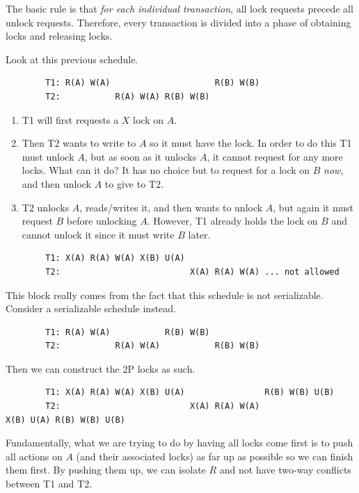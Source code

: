     \begin{definition}
      \label{def:two-phase-locking-2pl}
      The basic rule is that \textit{for each individual transaction}, all lock requests precede all unlock requests. Therefore, every transaction is divided into a phase of obtaining locks and releasing locks.   
    \end{definition}

    \begin{example}[2PL]
      \label{ex:2pl}
      Look at this previous schedule. 
      \begin{lstlisting}
        T1: R(A) W(A)                     R(B) W(B)
        T2:           R(A) W(A) R(B) W(B) 
      \end{lstlisting}
      \begin{enumerate}
        \item T1 will first requests a $X$ lock on $A$. 
        \item Then T2 wants to write to $A$ so it must have the lock. In order to do this T1 must unlock $A$, but as soon as it unlocks $A$, it cannot request for any more locks. What can it do? It has no choice but to request for a lock on $B$ \textit{now}, and then unlock $A$ to give to T2. 
        \item T2 unlocks $A$, reads/writes it, and then wants to unlock $A$, but again it must request $B$ before unlocking $A$. However, T1 already holds the lock on $B$ and cannot unlock it since it must write $B$ later. 
      \end{enumerate}
      \begin{lstlisting} 
        T1: X(A) R(A) W(A) X(B) U(A) 
        T2:                          X(A) R(A) W(A) ... not allowed
      \end{lstlisting}
      This block really comes from the fact that this schedule is not serializable. Consider a serializable schedule instead. 
      \begin{lstlisting} 
        T1: R(A) W(A)           R(B) W(B)
        T2:           R(A) W(A)           R(B) W(B) 
      \end{lstlisting} 
      Then we can construct the 2P locks as such. 
      \begin{lstlisting}
        T1: X(A) R(A) W(A) X(B) U(A)                R(B) W(B) U(B) 
        T2:                          X(A) R(A) W(A)                X(B) U(A) R(B) W(B) U(B) 
      \end{lstlisting}
      Fundamentally, what we are trying to do by having all locks come first is to push all actions on $A$ (and their associated locks) as far up as possible so we can finish them first. By pushing them up, we can isolate $R$ and not have two-way conflicts between T1 and T2. 
    \end{example}

